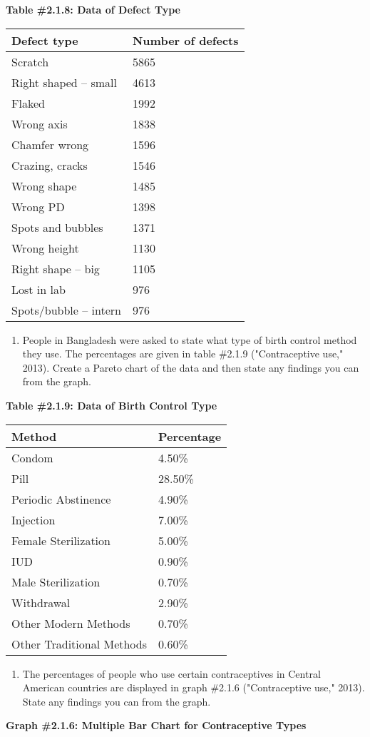 \documentclass[]{book}
\providecommand{\tightlist}{%
  \setlength{\itemsep}{0pt}\setlength{\parskip}{0pt}}
\begin{document}
\textbf{Table \#2.1.8: Data of Defect Type}

\begin{longtable}[]{@{}ll@{}}
\toprule
Defect type & Number of defects\tabularnewline
\midrule
\endhead
Scratch & 5865\tabularnewline
Right shaped -- small & 4613\tabularnewline
Flaked & 1992\tabularnewline
Wrong axis & 1838\tabularnewline
Chamfer wrong & 1596\tabularnewline
Crazing, cracks & 1546\tabularnewline
Wrong shape & 1485\tabularnewline
Wrong PD & 1398\tabularnewline
Spots and bubbles & 1371\tabularnewline
Wrong height & 1130\tabularnewline
Right shape -- big & 1105\tabularnewline
Lost in lab & 976\tabularnewline
Spots/bubble -- intern & 976\tabularnewline
\bottomrule
\end{longtable}

\begin{enumerate}
\def\labelenumi{\arabic{enumi}.}
\setcounter{enumi}{5}
\tightlist
\item
  People in Bangladesh were asked to state what type of birth control
  method they use. The percentages are given in table \#2.1.9
  ("Contraceptive use," 2013). Create a Pareto chart of the data and
  then state any findings you can from the graph.
\end{enumerate}

\textbf{Table \#2.1.9: Data of Birth Control Type}

\begin{longtable}[]{@{}ll@{}}
\toprule
Method & Percentage\tabularnewline
\midrule
\endhead
Condom & 4.50\%\tabularnewline
Pill & 28.50\%\tabularnewline
Periodic Abstinence & 4.90\%\tabularnewline
Injection & 7.00\%\tabularnewline
Female Sterilization & 5.00\%\tabularnewline
IUD & 0.90\%\tabularnewline
Male Sterilization & 0.70\%\tabularnewline
Withdrawal & 2.90\%\tabularnewline
Other Modern Methods & 0.70\%\tabularnewline
Other Traditional Methods & 0.60\%\tabularnewline
\bottomrule
\end{longtable}

\begin{enumerate}
\def\labelenumi{\arabic{enumi}.}
\setcounter{enumi}{6}
\tightlist
\item
  The percentages of people who use certain contraceptives in Central
  American countries are displayed in graph \#2.1.6 ("Contraceptive
  use," 2013). State any findings you can from the graph.
\end{enumerate}

\textbf{Graph \#2.1.6: Multiple Bar Chart for Contraceptive Types}
\end{document}
